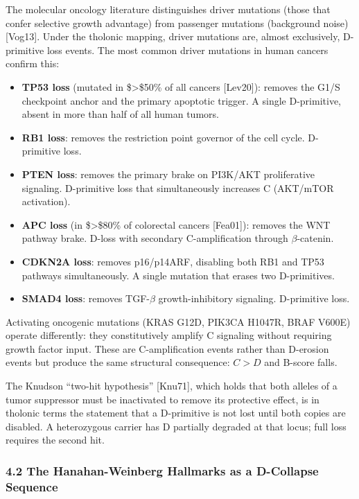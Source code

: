 \documentclass[
  11pt,
  letterpaper,
]{article}
\providecommand{\tightlist}{%
  \setlength{\itemsep}{0pt}\setlength{\parskip}{0pt}}
\begin{document}
The molecular oncology literature distinguishes driver mutations (those
that confer selective growth advantage) from passenger mutations
(background noise) {[}Vog13{]}. Under the tholonic mapping, driver
mutations are, almost exclusively, D-primitive loss events. The most
common driver mutations in human cancers confirm this:

\begin{itemize}
\tightlist
\item
  \textbf{TP53 loss} (mutated in \$\textgreater\$50\% of all cancers
  {[}Lev20{]}): removes the G1/S checkpoint anchor and the primary
  apoptotic trigger. A single D-primitive, absent in more than half of
  all human tumors.
\item
  \textbf{RB1 loss}: removes the restriction point governor of the cell
  cycle. D-primitive loss.
\item
  \textbf{PTEN loss}: removes the primary brake on PI3K/AKT
  proliferative signaling. D-primitive loss that simultaneously
  increases C (AKT/mTOR activation).
\item
  \textbf{APC loss} (in \$\textgreater\$80\% of colorectal cancers
  {[}Fea01{]}): removes the WNT pathway brake. D-loss with secondary
  C-amplification through \(\beta\)-catenin.
\item
  \textbf{CDKN2A loss}: removes p16/p14ARF, disabling both RB1 and TP53
  pathways simultaneously. A single mutation that erases two
  D-primitives.
\item
  \textbf{SMAD4 loss}: removes TGF-\(\beta\) growth-inhibitory
  signaling. D-primitive loss.
\end{itemize}

Activating oncogenic mutations (KRAS G12D, PIK3CA H1047R, BRAF V600E)
operate differently: they constitutively amplify C signaling without
requiring growth factor input. These are C-amplification events rather
than D-erosion events but produce the same structural consequence:
\(C > D\) and B-score falls.

The Knudson ``two-hit hypothesis'' {[}Knu71{]}, which holds that both
alleles of a tumor suppressor must be inactivated to remove its
protective effect, is in tholonic terms the statement that a D-primitive
is not lost until both copies are disabled. A heterozygous carrier has D
partially degraded at that locus; full loss requires the second hit.

\subsubsection{4.2 The Hanahan-Weinberg Hallmarks as a D-Collapse
Sequence}\label{the-hanahan-weinberg-hallmarks-as-a-d-collapse-sequence}
\end{document}
